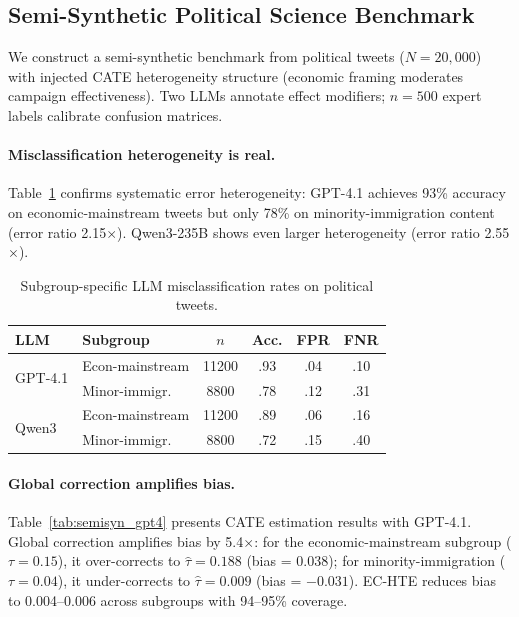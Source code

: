 \documentclass[11pt,a4paper]{article}
\begin{document}
\subsection{Semi-Synthetic Political Science Benchmark}
\label{sec:semisynthetic}

We construct a semi-synthetic benchmark from political tweets ($N = 20{,}000$) with injected CATE heterogeneity structure (economic framing moderates campaign effectiveness). Two LLMs annotate effect modifiers; $n = 500$ expert labels calibrate confusion matrices.

\paragraph{Misclassification heterogeneity is real.} Table~\ref{tab:misclass} confirms systematic error heterogeneity: GPT-4.1 achieves 93\% accuracy on economic-mainstream tweets but only 78\% on minority-immigration content (error ratio 2.15$\times$). Qwen3-235B shows even larger heterogeneity (error ratio 2.55$\times$).

\begin{table}[t]
\centering
\small
\setlength{\tabcolsep}{3pt}
\begin{tabular}{llcccc}
\toprule
LLM & Subgroup & $n$ & Acc. & FPR & FNR \\
\midrule
\multirow{2}{*}{GPT-4.1}
 & Econ-mainstream & 11200 & .93 & .04 & .10 \\
 & Minor-immigr. & 8800 & .78 & .12 & .31 \\
\midrule
\multirow{2}{*}{Qwen3}
 & Econ-mainstream & 11200 & .89 & .06 & .16 \\
 & Minor-immigr. & 8800 & .72 & .15 & .40 \\
\bottomrule
\end{tabular}
\caption{Subgroup-specific LLM misclassification rates on political tweets.}
\label{tab:misclass}
\end{table}

\paragraph{Global correction amplifies bias.} Table~\ref{tab:semisyn_gpt4} presents CATE estimation results with GPT-4.1. Global correction amplifies bias by 5.4$\times$: for the economic-mainstream subgroup ($\tau = 0.15$), it over-corrects to $\hat{\tau} = 0.188$ (bias = 0.038); for minority-immigration ($\tau = 0.04$), it under-corrects to $\hat{\tau} = 0.009$ (bias = $-0.031$). EC-HTE reduces bias to 0.004--0.006 across subgroups with 94--95\% coverage.
\end{document}

